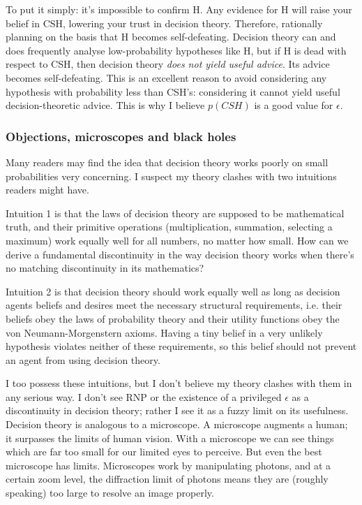 \documentclass{article}
\begin{document}
To put it simply: it's impossible to confirm H. Any evidence for H will raise your belief in CSH, lowering your trust in decision theory. Therefore, rationally planning on the basis that H becomes self-defeating. Decision theory can and does frequently analyse low-probability hypotheses like H, but if H is dead with respect to CSH, then decision theory \textit{does not yield useful advice}. Its advice becomes self-defeating. This is an excellent reason to avoid considering any hypothesis with probability less than CSH's: considering it cannot yield useful decision-theoretic advice. This is why I believe \(p(CSH)\) is a good value for \(\epsilon\).

\subsubsection{Objections, microscopes and black holes}

Many readers may find the idea that decision theory works poorly on small probabilities very concerning. I suspect my theory clashes with two intuitions readers might have. 

Intuition 1 is that the laws of decision theory are supposed to be mathematical truth, and their primitive operations (multiplication, summation, selecting a maximum) work equally well for all numbers, no matter how small. How can we derive a fundamental discontinuity in the way decision theory works when there's no matching discontinuity in its mathematics? %

Intuition 2 is that decision theory should work equally well as long as decision agents beliefs and desires meet the necessary structural requirements, i.e. their beliefs obey the laws of probability theory and their utility functions obey the von Neumann-Morgenstern axioms. Having a tiny belief in a very unlikely hypothesis violates neither of these requirements, so this belief should not prevent an agent from using decision theory. %

I too possess these intuitions, but I don't believe my theory clashes with them in any serious way. I don't see RNP or the existence of a privileged \(\epsilon\) as a discontinuity in decision theory; rather I see it as a fuzzy limit on its usefulness. Decision theory is analogous to a microscope. A microscope augments a human; it surpasses the limits of human vision. With a microscope we can see things which are far too small for our limited eyes to perceive. But even the best microscope has limits. Microscopes work by manipulating photons, and at a certain zoom level, the diffraction limit of photons means they are (roughly speaking) too large to resolve an image properly. 
\end{document}
